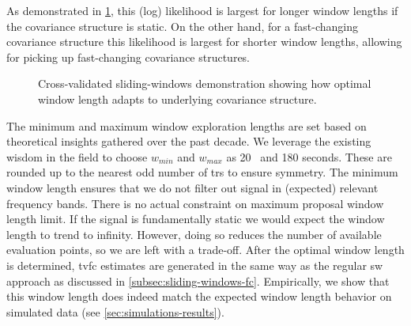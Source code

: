 As demonstrated in \cref{fig:sw-cv-demo}, this (log) likelihood is largest for longer window lengths if the covariance structure is static.
On the other hand, for a fast-changing covariance structure this likelihood is largest for shorter window lengths, allowing for picking up fast-changing covariance structures.


\begin{figure}[t]
  \centering
  \caption{
    Cross-validated sliding-windows demonstration showing how optimal window length adapts to underlying covariance structure.
  }
  \label{fig:sw-cv-demo}
\end{figure}


The minimum and maximum window exploration lengths are set based on theoretical insights gathered over the past decade.
We leverage the existing wisdom in the field to choose $w_{min}$ and $w_{max}$ as 20~\parencite{Leonardi2015} and 180 seconds.
These are rounded up to the nearest odd number of \glspl{tr} to ensure symmetry.
%
The minimum window length ensures that we do not filter out signal in (expected) relevant frequency bands.
There is no actual constraint on maximum proposal window length limit.
If the signal is fundamentally static we would expect the window length to trend to infinity.
However, doing so reduces the number of available evaluation points, so we are left with a trade-off.
%
After the optimal window length is determined, \gls{tvfc} estimates are generated in the same way as the regular \gls{sw} approach as discussed in \cref{subsec:sliding-windows-fc}.
%
Empirically, we show that this window length does indeed match the expected window length behavior on simulated data (see \cref{sec:simulations-results}).
